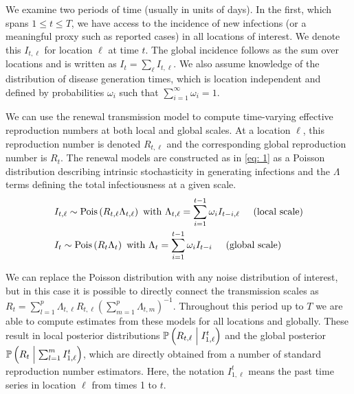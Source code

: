 \documentclass[12pt]{article}
\newcommand{\cond}{\; \m| \;}
\begin{document}
We examine two periods of time (usually in units of days). In the first, which
spans $1\leq t \leq T$, we have access to the incidence of new infections (or a
meaningful proxy such as reported cases) in all locations of interest. We denote
this $I_{t, \ell}$ for location $\ell$ at time $t$. The global incidence follows
as the sum over locations and is written as $I_t = \sum_{\ell} I_{t, \ell}$. We
also assume knowledge of the distribution of disease generation times, which is
location independent and defined by probabilities $\omega_i$ such that
$\sum_{i=1}^{\infty}\omega_{i} = 1$.

We can use the renewal transmission model to compute time-varying effective
reproduction numbers at both local and global scales. At a location $\ell$, this
reproduction number is denoted $R_{t, \ell}$ and the corresponding global
reproduction number is $R_{t}$. The renewal models are constructed as in
\eqref{eq: 1} as a Poisson distribution describing intrinsic
stochasticity in generating infections and the $\Lambda$ terms defining the
total infectiousness at a given scale.
\begin{equation}\label{eq: 1}
\begin{aligned}
& I_{t, \ell} \sim \text{Pois} 
\left(R_{t, \ell}\Lambda_{t, \ell}\right) \text{ with } \Lambda_{t, \ell} = \sum_{i=1}^{t-1}
\omega_{i}I_{t-i, \ell} \hspace{0.5cm}\text{(local scale)} \\
& I_t \sim \text{Pois} 
\left(R_t\Lambda_t\right) \text{ with } \Lambda_t = \sum_{i=1}^{t-1}
\omega_{i}I_{t-i} \hspace{0.5cm}\text{(global scale)}
\end{aligned}
\end{equation}

We can replace the Poisson distribution with any noise distribution of interest,
but in this case it is possible to directly connect the transmission scales as
$R_t = \sum_{l=1}^p \Lambda_{t, \ell}R_{t, \ell}\left(\sum_{m=1}^p \Lambda_{t,
m}\right)^{-1}$. Throughout this period up to $T$ we are able to compute
estimates from these models for all locations and globally. These result in
local posterior distributions $\mathbb{P}\left(R_{t, \ell} \cond I_{1,
\ell}^{t}\right)$ and the global posterior $\mathbb{P}\left(R_{t} \cond
\sum_{l=1}^m I_{1, \ell}^{t}\right)$, which are directly obtained from a number
of standard reproduction number estimators. Here, the notation $I_{1, \ell}^{t}$
means the past time series in location $\ell$ from times 1 to $t$.
\end{document}
